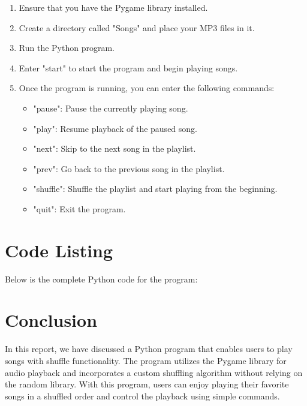 \documentclass{article}
\begin{document}
\begin{enumerate}
    \item Ensure that you have the Pygame library installed.
    \item Create a directory called "Songs" and place your MP3 files in it.
    \item Run the Python program.
    \item Enter "start" to start the program and begin playing songs.
    \item Once the program is running, you can enter the following commands:
    \begin{itemize}
        \item "pause": Pause the currently playing song.
        \item "play": Resume playback of the paused song.
        \item "next": Skip to the next song in the playlist.
        \item "prev": Go back to the previous song in the playlist.
        \item "shuffle": Shuffle the playlist and start playing from the beginning.
        \item "quit": Exit the program.
    \end{itemize}
\end{enumerate}

\section{Code Listing}
Below is the complete Python code for the program:



\section{Conclusion}
In this report, we have discussed a Python program that enables users to play songs with shuffle functionality. The program utilizes the Pygame library for audio playback and incorporates a custom shuffling algorithm without relying on the random library. With this program, users can enjoy playing their favorite songs in a shuffled order and control the playback using simple commands.
\end{document}
